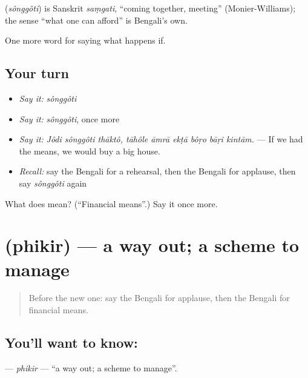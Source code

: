 \begin{cousinweb}
\textbf{} (\emph{sônggôti}) is Sanskrit \emph{saṃgati}, \textquotedblleft{}coming together, meeting\textquotedblright{} (Monier-Williams); the sense \textquotedblleft{}what one can afford\textquotedblright{} is Bengali's own.
\end{cousinweb}

\begin{grammarlens}[title={What you've built}]
One more word for saying what happens if.
\end{grammarlens}

\subsection*{Your turn}
\begin{itemize}
\raggedright
  \item \emph{Say it:} \emph{sônggôti}
  \item \emph{Say it:} \emph{sônggôti}, once more
  \item \emph{Say it:} \emph{Jôdi sônggôti thāktô, tāhôle āmrā ekṭā bôṛo bāṛi kintām.} — If we had the means, we would buy a big house.
  \item \emph{Recall:} say the Bengali for a rehearsal, then the Bengali for applause, then say \emph{sônggôti} again
\end{itemize}

\begin{tcolorbox}[breakable,colback=teal!4,colframe=teal!35!black,title={Before you move on}]
What does  mean? (\textquotedblleft{}Financial means\textquotedblright{}.) Say it once more.
\end{tcolorbox}
\section[\texorpdfstring{\bn{ফিকির} (phikir)}{ফিকির (phikir)}]{ (phikir) — a way out; a scheme to manage}

\label{lesson:BN-C528-phikir}



\begin{quote}
Before the new one: say the Bengali for applause, then the Bengali for financial means.
\end{quote}

\subsection*{You'll want to know: }
\textbf{} — \emph{phikir} — \textquotedblleft{}a way out; a scheme to manage\textquotedblright{}.

